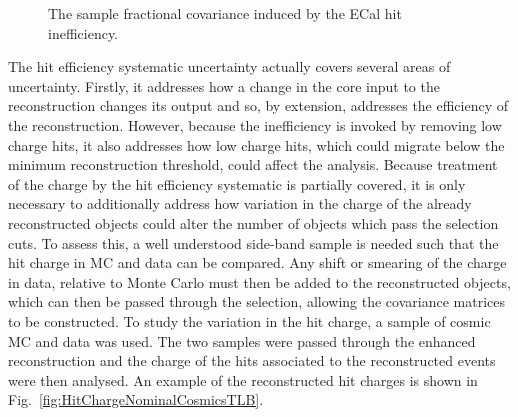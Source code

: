 \begin{figure}%
  \centering
  \caption{The sample fractional covariance induced by the ECal hit inefficiency.}
  \label{fig:ECalThresholdCovarianceMatrices}
\end{figure}
\newline
\newline
The hit efficiency systematic uncertainty actually covers several areas of uncertainty.  Firstly, it addresses how a change in the core input to the reconstruction changes its output and so, by extension, addresses the efficiency of the reconstruction.  However, because the inefficiency is invoked by removing low charge hits, it also addresses how low charge hits, which could migrate below the minimum reconstruction threshold, could affect the analysis.  Because treatment of the charge by the hit efficiency systematic is partially covered, it is only necessary to additionally address how variation in the charge of the already reconstructed objects could alter the number of objects which pass the selection cuts.  To assess this, a well understood side-band sample is needed such that the hit charge in MC and data can be compared.  Any shift or smearing of the charge in data, relative to Monte Carlo must then be added to the reconstructed objects, which can then be passed through the selection, allowing the covariance matrices to be constructed.  To study the variation in the hit charge, a sample of cosmic MC and data was used.  The two samples were passed through the enhanced reconstruction and the charge of the hits associated to the reconstructed events were then analysed.  An example of the reconstructed hit charges is shown in Fig.~\ref{fig:HitChargeNominalCosmicsTLB}.  
